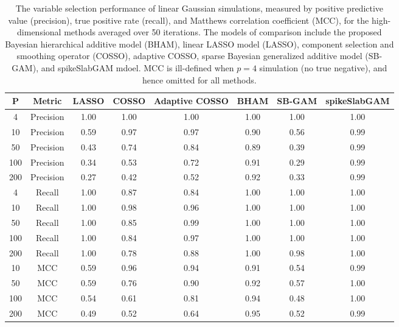 \begin{table}[ht]
\centering
\begin{tabular}{cccccccc}
  \hline
P & Metric & LASSO & COSSO & Adaptive COSSO & BHAM & SB-GAM & spikeSlabGAM \\ 
  \hline
  4 & Precision & 1.00 & 1.00 & 1.00 & 1.00 & 1.00 & 1.00 \\ 
   10 & Precision & 0.59 & 0.97 & 0.97 & 0.90 & 0.56 & 0.99 \\ 
   50 & Precision & 0.43 & 0.74 & 0.84 & 0.89 & 0.39 & 0.99 \\ 
  100 & Precision & 0.34 & 0.53 & 0.72 & 0.91 & 0.29 & 0.99 \\ 
  200 & Precision & 0.27 & 0.42 & 0.52 & 0.92 & 0.33 & 0.99 \\ 
    4 & Recall & 1.00 & 0.87 & 0.84 & 1.00 & 1.00 & 1.00 \\ 
   10 & Recall & 1.00 & 0.98 & 0.96 & 1.00 & 1.00 & 1.00 \\ 
   50 & Recall & 1.00 & 0.85 & 0.99 & 1.00 & 1.00 & 1.00 \\ 
  100 & Recall & 1.00 & 0.84 & 0.97 & 1.00 & 1.00 & 1.00 \\ 
  200 & Recall & 1.00 & 0.78 & 0.88 & 1.00 & 0.98 & 1.00 \\ 
   10 & MCC & 0.59 & 0.96 & 0.94 & 0.91 & 0.54 & 0.99 \\ 
   50 & MCC & 0.59 & 0.76 & 0.90 & 0.92 & 0.57 & 1.00 \\ 
  100 & MCC & 0.54 & 0.61 & 0.81 & 0.94 & 0.48 & 1.00 \\ 
  200 & MCC & 0.49 & 0.52 & 0.64 & 0.95 & 0.52 & 0.99 \\ 
   \hline
\end{tabular}
\caption{The variable selection performance of linear Gaussian
                         simulations, measured by positive predictive value (precision),
                         true positive rate (recall), and Matthews correlation coefficient (MCC),
                         for the high-dimensional methods averaged over 50 iterations.
                         The models of comparison include the proposed Bayesian hierarchical additive model (BHAM),
                         linear LASSO model (LASSO), component selection and smoothing operator (COSSO),
                         adaptive COSSO, sparse Bayesian generalized additive model (SB-GAM), and spikeSlabGAM mdoel.
                         MCC is ill-defined when $p=4$ simulation (no true negative), and hence omitted for all methods.} 
\label{tab:sim_lnr_gaus_var_select}
\end{table}
